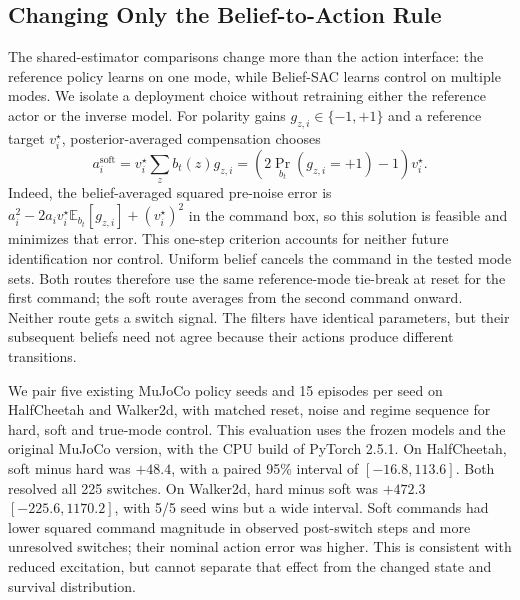 \FloatBarrier
\subsection{Changing Only the Belief-to-Action Rule}
\label{sec:frozen_interface}

The shared-estimator comparisons change more than the action interface: the reference policy learns on one mode, while Belief-SAC learns control on multiple modes. We isolate a deployment choice without retraining either the reference actor or the inverse model. For polarity gains \(g_{z,i}\in\{-1,+1\}\) and a reference target \(v_i^\star\), posterior-averaged compensation chooses
\begin{equation}
    a_i^{\mathrm{soft}} =
    v_i^\star \sum_z b_t(z)g_{z,i} =
    (2\Pr_{b_t}(g_{z,i}=+1)-1)v_i^\star .
    \label{eq:soft_polarity}
\end{equation}
Indeed, the belief-averaged squared pre-noise error is \(a_i^2-2a_i v_i^\star \mathbb{E}_{b_t}[g_{z,i}]+(v_i^\star)^2\) in the command box, so this solution is feasible and minimizes that error. This one-step criterion accounts for neither future identification nor control. Uniform belief cancels the command in the tested mode sets. Both routes therefore use the same reference-mode tie-break at reset for the first command; the soft route averages from the second command onward. Neither route gets a switch signal. The filters have identical parameters, but their subsequent beliefs need not agree because their actions produce different transitions.

We pair five existing MuJoCo policy seeds and 15 episodes per seed on HalfCheetah and Walker2d, with matched reset, noise and regime sequence for hard, soft and true-mode control. This evaluation uses the frozen models and the original MuJoCo version, with the CPU build of PyTorch 2.5.1. On HalfCheetah, soft minus hard was \(+48.4\), with a paired 95\% interval of \([-16.8,113.6]\). Both resolved all 225 switches. On Walker2d, hard minus soft was \(+472.3\) \([-225.6,1170.2]\), with 5/5 seed wins but a wide interval. Soft commands had lower squared command magnitude in observed post-switch steps and more unresolved switches; their nominal action error was higher. This is consistent with reduced excitation, but cannot separate that effect from the changed state and survival distribution.

